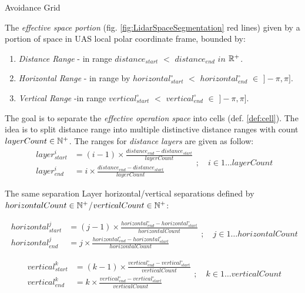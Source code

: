 \begin{definition}{Avoidance Grid}\label{def:AvoidanceGrid} 


\noindent The \emph{effective space portion} (fig. \ref{fig:LidarSpaceSegmentation} red lines) given by a portion of space in UAS local polar coordinate frame, bounded by:
    \begin{enumerate}
        \item \emph{Distance Range} -  in range $distance_{start}$ $<$ $distance_{end}$ $in$ $\mathbb{R}^+$.
        \item \emph{Horizontal Range} - in range by $horizontal^\circ_{start}$ $<$ $horizontal^\circ_{end}$ $\in$ $]-\pi,\pi]$.
        \item \emph{Vertical Range} -in range $vertical^\circ_{start}$ $<$ $vertical^\circ_{end}$ $\in$ $]-\pi,\pi]$.
    \end{enumerate}

\noindent The goal is to separate the \emph{effective operation space} into cells (def. \ref{def:cell}). The idea is to split distance range into multiple distinctive distance ranges with count $layerCount \in \mathbb{N}^+$.  The ranges for \emph{distance layers} are given as follow:
\begin{equation}\label{eq:avoidanceGridCellDistanceRange}
    \begin{aligned}
        layer^i_{start} & = (i-1)\times\frac{distance_{end}-distance_{start}}{layer Count}\\
        layer^i_{end} & = i\times\frac{distance_{end}-distance_{start}}{layer Count}
    \end{aligned};\quad i\in 1\dots layer Count
\end{equation}

\noindent The same separation Layer horizontal/vertical separations defined by $horizontal Count \in \mathbb{N}^+$/$vertical Count \in \mathbb{N}^+$:

\begin{equation}\label{eq:avoidanceGridCellHorizontalRange}
    \begin{aligned}
        horizontal^j_{start} & = (j-1)\times\frac{horizontal^\circ_{end}-horizontal^\circ_{start}}{horizontal Count}\\
        horizontal^j_{end} & = j\times\frac{horizontal^\circ_{end}-horizontal^\circ_{start}}{horizontal Count}
    \end{aligned};\quad j\in 1\dots horizontal Count
\end{equation}


\begin{equation}\label{eq:avoidanceGridCellVerticalRange}
    \begin{aligned}
        vertical^k_{start} & = (k-1)\times\frac{vertical^\circ_{end}-vertical^\circ_{start}}{vertical Count}\\
        vertical^k_{end} & = k\times\frac{vertical^\circ_{end}-vertical^\circ_{start}}{vertical Count}
    \end{aligned};\quad k\in 1\dots vertical Count
\end{equation}



\end{definition}
